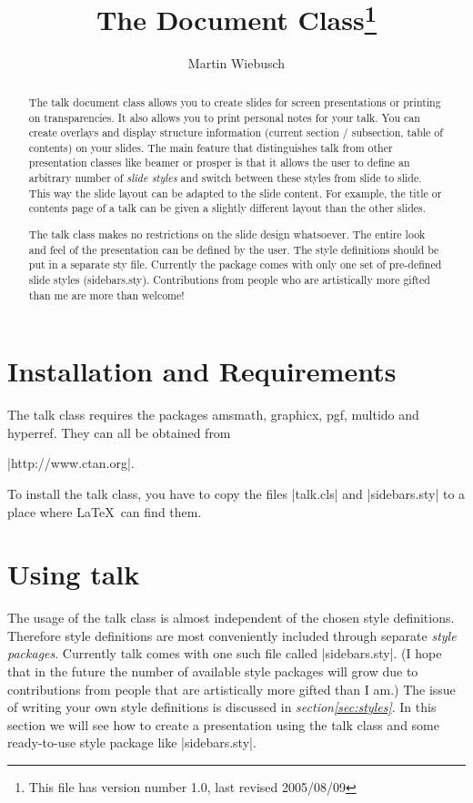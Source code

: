 \documentclass[12pt]{ltxdoc}
\title{The \pkg{talk} Document Class\thanks{This file has version number 1.0,
    last revised 2005/08/09}}
\author{Martin Wiebusch}
\newcommand{\mref}[2]{\textsl{#1\space\ref{#2}}}
\newcommand{\pkg}[1]{\textsf{#1}}
\renewenvironment{quote}{\list{}{\leftmargin\parindent}\item[]}{\endlist}
\begin{document}
\maketitle
\begin{abstract}
  The \pkg{talk} document class allows you to create slides for screen
  presentations or printing on transparencies. It also allows you to print
  personal notes for your talk. You can create overlays and display structure
  information (current section / subsection, table of contents) on your slides.
  The main feature that distinguishes \pkg{talk} from other presentation classes
  like \pkg{beamer} or \pkg{prosper} is that it allows the user to define an
  arbitrary number of \emph{slide styles} and switch between these styles from
  slide to slide. This way the slide layout can be adapted to the slide
  content. For example, the title or contents page of a talk can be given a
  slightly different layout than the other slides.

  The \pkg{talk} class makes no restrictions on the slide design whatsoever. The
  entire look and feel of the presentation can be defined by the user. The style
  definitions should be put in a separate sty file. Currently the package comes
  with only one set of pre-defined slide styles (sidebars.sty). Contributions
  from people who are artistically more gifted than me are more than welcome!
\end{abstract}
\newpage
\tableofcontents
%
%
%
\section{Installation and Requirements}
%
%
The \pkg{talk} class requires the packages \pkg{amsmath}, \pkg{graphicx},
\pkg{pgf}, \pkg{multido} and \pkg{hyperref}. They can all be obtained from
\begin{quote}
  |http://www.ctan.org|.
\end{quote}

To install the \pkg{talk} class, you have to copy the files |talk.cls| and
|sidebars.sty| to a place where \LaTeX\ can find them.
%
%
%
\section{Using \pkg{talk}}
%
%
The usage of the \pkg{talk} class is almost independent of the chosen style
definitions. Therefore style definitions are most conveniently included through
separate \emph{style packages}. Currently \pkg{talk} comes with one such file
called |sidebars.sty|. (I hope that in the future the number of available style
packages will grow due to contributions from people that are artistically more
gifted than I am.) The issue of writing your own style definitions is discussed
in \mref{section}{sec:styles}. In this section we will see how to create a
presentation using the \pkg{talk} class and some ready-to-use style package like
|sidebars.sty|.
\end{document}
